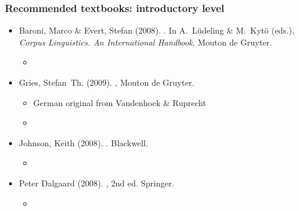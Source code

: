 \documentclass[t]{beamer} %
\begin{document}
\begin{frame}
  \frametitle{Recommended textbooks: introductory level}

  \begin{itemize}
  \item Baroni, Marco \& Evert, Stefan (2008).  .  In A.~L{\"u}deling \& M.~Kyt{\"o}
    (eds.), {\em Corpus Linguistics. An International Handbook}. Mouton de Gruyter.
    \begin{itemize}
    \item[]
    \end{itemize}
  \item Gries, Stefan~Th. (2009). , Mouton de Gruyter. %
    \begin{itemize}
    \item German original from Vandenhoek \& Ruprecht \secondary{[\texteuro 25]}
    \item[]
    \end{itemize}
  \item Johnson, Keith (2008). .
    Blackwell. \secondary{[\texteuro 31]}
    \begin{itemize}
    \item[]
    \end{itemize}
  \item Peter Dalgaard (2008). ,
     2nd ed. Springer.
    \begin{itemize}
    \item[]
    \end{itemize}
  \end{itemize}
\end{frame}
\end{document}
